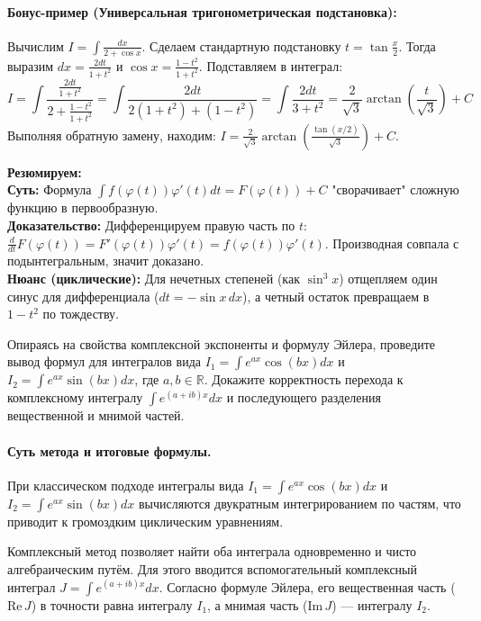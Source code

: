 \paragraph{Бонус-пример (Универсальная тригонометрическая подстановка):}
Вычислим $I = \int \frac{dx}{2 + \cos x}$. Сделаем стандартную подстановку $t = \tan \frac{x}{2}$. Тогда выразим $dx = \frac{2dt}{1+t^2}$ и $\cos x = \frac{1-t^2}{1+t^2}$. Подставляем в интеграл:
$$ I = \int \frac{\frac{2dt}{1+t^2}}{2 + \frac{1-t^2}{1+t^2}} = \int \frac{2dt}{2(1+t^2) + (1-t^2)} = \int \frac{2dt}{3 + t^2} = \frac{2}{\sqrt{3}} \arctan\left(\frac{t}{\sqrt{3}}\right) + C $$
Выполняя обратную замену, находим: $I = \frac{2}{\sqrt{3}} \arctan\left(\frac{\tan(x/2)}{\sqrt{3}}\right) + C$.
\begin{tcolorbox}[colback=gray!5, colframe=black, boxrule=0.5pt, arc=0pt]
\textbf{Резюмируем:} \\
\textbf{Суть:} Формула $\int f(\varphi(t))\varphi'(t)dt=F(\varphi(t))+C$ "сворачивает" сложную функцию в первообразную. \\
\textbf{Доказательство:} Дифференцируем правую часть по $t$: $\frac{d}{dt}F(\varphi(t))=F'(\varphi(t))\varphi'(t)=f(\varphi(t))\varphi'(t)$. Производная совпала с подынтегральным, значит доказано. \\
\textbf{Нюанс (циклические):} Для нечетных степеней (как $\sin^3 x$) отщепляем один синус для дифференциала ($dt=-\sin x\,dx$), а четный остаток превращаем в $1-t^2$ по тождеству.
\end{tcolorbox}




{Опираясь на свойства комплексной экспоненты и формулу Эйлера, проведите вывод формул для интегралов вида $I_{1}=\int e^{ax}\cos(bx)dx$ и $I_{2}=\int e^{ax}\sin(bx)dx$, где $a,b\in\mathbb{R}$. Докажите корректность перехода к комплексному интегралу $\int e^{(a+ib)x}dx$ и последующего разделения вещественной и мнимой частей.}

\paragraph{Суть метода и итоговые формулы.}
При классическом подходе интегралы вида $I_1 = \int e^{ax}\cos(bx)dx$ и $I_2 = \int e^{ax}\sin(bx)dx$ вычисляются двукратным интегрированием по частям, что приводит к громоздким циклическим уравнениям. 

Комплексный метод позволяет найти оба интеграла одновременно и чисто алгебраическим путём. Для этого вводится вспомогательный комплексный интеграл $J = \int e^{(a+ib)x} dx$. Согласно формуле Эйлера, его вещественная часть ($\text{Re}\,J$) в точности равна интегралу $I_1$, а мнимая часть ($\text{Im}\,J$) — интегралу $I_2$.

